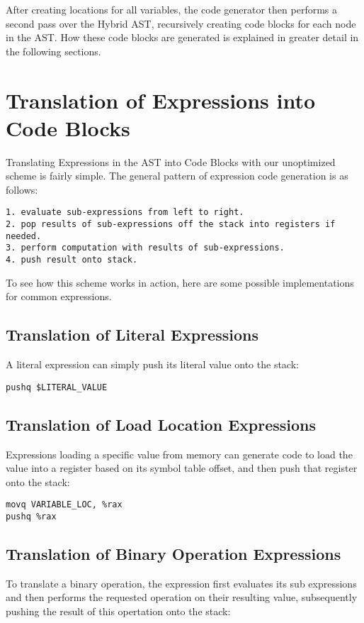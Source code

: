 \documentclass[11pt]{article}
\begin{document}
After creating locations for all variables, the code generator then performs a second pass over the Hybrid AST, recursively creating code blocks for each node in the AST. How these code blocks are generated is explained in greater detail in the following sections. 

\section {Translation of Expressions into Code Blocks}
\label{sec:expr}

Translating Expressions in the AST into Code Blocks with our unoptimized scheme is fairly simple. The general pattern of expression code generation is as follows: 

\begin{verbatim}
1. evaluate sub-expressions from left to right.
2. pop results of sub-expressions off the stack into registers if needed.
3. perform computation with results of sub-expressions.
4. push result onto stack. 
\end{verbatim}

To see how this scheme works in action, here are some possible implementations for common expressions. 

\subsection{Translation of Literal Expressions} 

A literal expression can simply push its literal value onto the stack: 

\begin{verbatim} 
pushq $LITERAL_VALUE 
\end{verbatim}

\subsection{Translation of Load Location Expressions} 

Expressions loading a specific value from memory can generate code to load the value into a register based on its symbol table offset, and then push that register onto the stack: 

\begin{verbatim}
movq VARIABLE_LOC, %rax
pushq %rax
\end{verbatim}

\subsection{Translation of Binary Operation Expressions} 
To translate a binary operation, the expression first evaluates its sub expressions and then performs the requested operation on their resulting value, subsequently pushing the result of this opertation onto the stack: 
\end{document}
